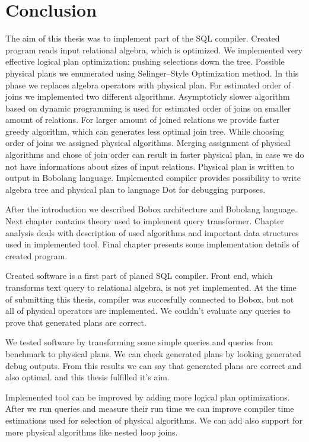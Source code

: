 \chapter{Conclusion}


The aim of this thesis was to implement part of the SQL compiler. Created program reads input relational algebra, which is optimized. We implemented very effective logical plan optimization: pushing selections down the tree. Possible physical plans we enumerated using Selinger--Style Optimization method. In this phase we replaces algebra operators with physical plan. For estimated order of joins we implemented two different algorithms. Asymptoticly slower algorithm based on dynamic programming is used for estimated order of joins on smaller amount of relations. For larger amount of joined relations we provide faster greedy algorithm, which can generates less optimal join tree. While choosing order of joins we assigned physical algorithms. Merging assignment of physical algorithms and chose of join order can result in faster physical plan, in case we do not have informations about sizes of input relations. Physical plan is written to output in Bobolang language. Implemented compiler provides possibility to write algebra tree and physical plan to language Dot for debugging purposes.

After the introduction we described Bobox architecture and Bobolang language. Next chapter contains theory used to implement query transformer. Chapter analysis deals with description of used algorithms and important data structures used in implemented tool. Final chapter presents some implementation details of created program.

Created software is a first part of planed SQL compiler. Front end, which transforms text query to relational algebra, is not yet implemented. At the time of submitting this thesis, compiler was succesfully connected to Bobox, but not all of physical operators are implemented. We couldn't evaluate any queries to prove that generated plans are correct.

We tested software by transforming some simple queries and queries from benchmark\cite{benchmark} to physical plans. We can check generated plans by looking generated debug outputs. From this results we can say that generated plans are correct and also optimal. and this thesis fulfilled it's aim. 


Implemented tool can be improved by adding more logical plan optimizations.
After we run queries and measure their run time we can improve compiler time estimations used for selection of physical algorithms. 
We can add also support for more physical algorithms like nested loop joins.

